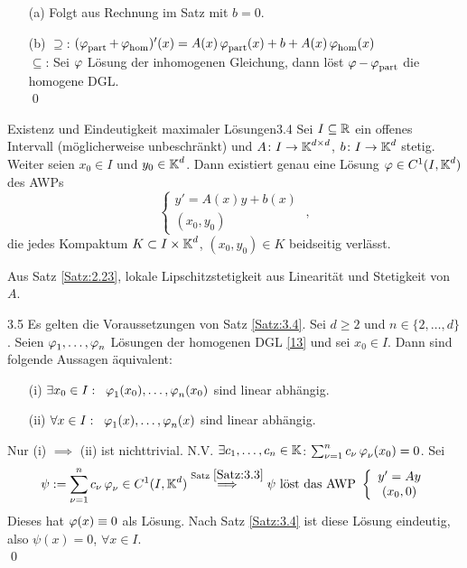 \documentclass[a4paper]{article}
\begin{document}
\begin{Beweis}
\begin{itemize}
    \item[(a)] Folgt aus Rechnung im Satz mit $b=0$.
    \item[(b)] \glqq $\supseteq$\grqq: $(\operatorname{\varphi}_{\mathrm{part}}+\operatorname{\varphi}_{\mathrm{hom}})'(x)=A(x)\operatorname{\varphi}_{\mathrm{part}}(x)+b+A(x)\operatorname{\varphi}_{\mathrm{hom}}(x)$\\
    \glqq $\subseteq$\grqq: Sei $\operatorname{\varphi}$ Lösung der inhomogenen Gleichung, dann löst $\operatorname{\varphi}-\operatorname{\varphi}_{\mathrm{part}}$ die homogene DGL.\\\qed
\end{itemize}
\end{Beweis}

\begin{Satz}{Existenz und Eindeutigkeit maximaler Lösungen}{3.4}
Sei $I\subseteq \mathbb R$ ein offenes Intervall (möglicherweise unbeschränkt) und $A\colon I\to\operatorname{\mathbb K}^{d\times d}$, $b\colon I\to\operatorname{\mathbb K}^d$ stetig. Weiter seien $x_0\in I$ und $y_0\in\operatorname{\mathbb K}^d$. Dann existiert genau eine Lösung $\operatorname{\varphi}\in C^1(I,\operatorname{\mathbb K}^d)$ des AWPs \[\left\{\begin{array}{l}
     y'=A(x)y+b(x)\\
     (x_0,y_0)
\end{array}\right.\;,\] die jedes Kompaktum $K\subset I\times \operatorname{\mathbb K}^d$, $(x_0,y_0)\in K$ beidseitig verlässt.
\end{Satz}

\begin{Beweis}
Aus Satz \ref{Satz:2.23}, lokale Lipschitzstetigkeit aus Linearität und Stetigkeit von $A$.
\end{Beweis}

\begin{Kor}{}{3.5}
Es gelten die Voraussetzungen von Satz \ref{Satz:3.4}. Sei $d\ge 2$ und $n\in\{2,\ldots,d\}$. Seien $\operatorname{\varphi}_1,\ldots,\operatorname{\varphi}_n$ Lösungen der homogenen DGL \eqref{13} und sei $x_0\in I$. Dann sind folgende Aussagen äquivalent:
\begin{itemize}
    \item[(i)] $\exists x_0\in I:\;\; \operatorname{\varphi}_1(x_0),\ldots,\operatorname{\varphi}_n(x_0)$ sind linear abhängig.
    \item[(ii)] $\forall x\in I:\;\;  \operatorname{\varphi}_1(x),\ldots,\operatorname{\varphi}_n(x)$ sind linear abhängig. 
\end{itemize}
\end{Kor}

\begin{Beweis}
Nur (i) $\implies$ (ii) ist nichttrivial. N.V. $\exists c_1,\ldots,c_n\in\operatorname{\mathbb K}$: $\sum_{\nu=1}^nc_{\nu}\operatorname{\varphi}_{\nu}(x_0)=0$. Sei
\[\psi:=\sum_{\nu=1}^nc_{\nu}\operatorname{\varphi}_{\nu}\in C^1(I,\operatorname{\mathbb K}^d)\overset{\text{Satz }\ref{Satz:3.3}}{\implies} \psi\text{ löst das AWP }\left\{ \begin{array}{c}
y'=Ay\\
(x_0,0)
\end{array}\right. \]
Dieses hat $\operatorname{\varphi}(x)\equiv0$ als Lösung. Nach Satz \ref{Satz:3.4} ist diese Lösung eindeutig, also $\psi(x)=0$, $\forall x\in I$.\\\qed
\end{Beweis}
\end{document}
